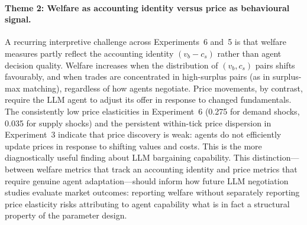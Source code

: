\paragraph{Theme 2: Welfare as accounting identity versus price as behavioural signal.}
A recurring interpretive challenge across Experiments~6 and~5 is that welfare measures partly reflect the accounting identity $(v_b - c_s)$ rather than agent decision quality.  Welfare increases when the distribution of $(v_b, c_s)$ pairs shifts favourably, and when trades are concentrated in high-surplus pairs (as in surplus-max matching), regardless of how agents negotiate.  Price movements, by contrast, require the LLM agent to adjust its offer in response to changed fundamentals.  The consistently low price elasticities in Experiment~6 (0.275 for demand shocks, 0.035 for supply shocks) and the persistent within-tick price dispersion in Experiment~3 indicate that price discovery is weak: agents do not efficiently update prices in response to shifting values and costs.  This is the more diagnostically useful finding about LLM bargaining capability.  This distinction---between welfare metrics that track an accounting identity and price metrics that require genuine agent adaptation---should inform how future LLM negotiation studies evaluate market outcomes: reporting welfare without separately reporting price elasticity risks attributing to agent capability what is in fact a structural property of the parameter design.

